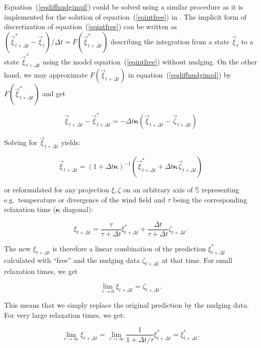 Equation~(\ref{eqdiffnudgimpl}) could be solved using a similar
procedure as it is implemented for the solution of
equation~(\ref{eqintfree}) in \echam. The implicit form of
discretization of equation~(\ref{eqintfree})
can be written as
$(\vec{\xi}^\ast_{t+\Delta t}-\vec{\xi}_t)/\Delta
t=F(\vec{\xi}^\ast_{t+\Delta t})$ describing the integration from a
state $\vec{\xi}_t$ to a state $\vec{\xi}^\ast_{t+\Delta t}$ using the
model equation~(\ref{eqintfree}) without nudging. 
On the other hand, we may approximate
$F(\vec{\xi}_{t+\Delta t})$ in equation~(\ref{eqdiffnudgimpl}) by
$F(\vec{\xi}^\ast_{t+\Delta t})$ and 
get

\begin{displaymath}
\vec{\xi}_{t+\Delta t}-\vec{\xi}^\ast_{t+\Delta t} = - \Delta t
\boldsymbol{\kappa} (\vec{\xi}_{t+\Delta t}-\vec{\zeta}_{t+\Delta t})
\end{displaymath} 

Solving for $\vec{\xi}_{t+\Delta t}$ yields:

\begin{equation}\label{eqnudgimplvec}
\vec{\xi}_{t+\Delta t}=(1+\Delta t
\boldsymbol{\kappa})^{-1}(\vec{\xi}^\ast_{t+\Delta t}+\Delta t
\boldsymbol{\kappa}\vec{\zeta}_{t+\Delta t})
\end{equation}

or reformulated for any projection $\xi,\zeta$ on an arbitrary axis of
$\mathbb{S}$ representing e.g.~temperature or divergence of the wind
field and $\tau$ being the corresponding relaxation time
($\boldsymbol{\kappa}$ diagonal):

\begin{equation}\label{eqnumnimpl}
\xi_{t+\Delta t}=\frac{\tau}{\tau+\Delta t}\xi^\ast_{t+\Delta
  t}+\frac{\Delta t}{\tau+\Delta t}\zeta_{t+\Delta t}.
\end{equation}

The new $\xi_{t+\Delta t}$ is therefore a linear combination of the
prediction $\xi^\ast_{t+\Delta t}$ calculated with ``free'' \echam{}
and the nudging data 
$\zeta_{t+\Delta t}$ at that time. For small relaxation
times, we get

\begin{equation}\label{eqlimittau0impl}
\lim\limits_{\tau \rightarrow 0}\xi_{t+\Delta t}=\zeta_{t+\Delta t}.
\end{equation}

This means that we simply replace the original prediction by the
nudging data. For very large relaxation times, we get:

\begin{equation}\label{eqlimittauinfimpl}
\lim\limits_{\tau \rightarrow \infty}\xi_{t+\Delta
  t}=\lim\limits_{\tau\rightarrow\infty}\frac{1}{1+\Delta
  t/\tau}\xi^\ast_{t+\Delta t}=\xi^\ast_{t+\Delta t}.
\end{equation}

